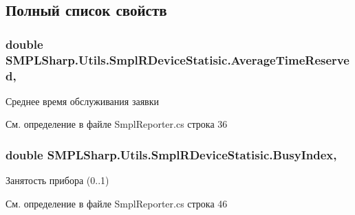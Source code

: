 \subsection{Полный список свойств}
\hypertarget{class_s_m_p_l_sharp_1_1_utils_1_1_smpl_r_device_statisic_aefc83dcc8f91247e91d1966ada1d7885}{
\subsubsection[{Average\-Time\-Reserved}]{\setlength{\rightskip}{0pt plus 5cm}double S\-M\-P\-L\-Sharp.\-Utils.\-Smpl\-R\-Device\-Statisic.\-Average\-Time\-Reserved\hspace{0.3cm}{\ttfamily [get]}, {\ttfamily [set]}}}\label{d7/d3b/class_s_m_p_l_sharp_1_1_utils_1_1_smpl_r_device_statisic_aefc83dcc8f91247e91d1966ada1d7885}


Среднее время обслуживания заявки 



См. определение в файле Smpl\-Reporter.\-cs строка 36

\hypertarget{class_s_m_p_l_sharp_1_1_utils_1_1_smpl_r_device_statisic_a437aa023cf628ea90f8a0f7091fb7e27}{
\subsubsection[{Busy\-Index}]{\setlength{\rightskip}{0pt plus 5cm}double S\-M\-P\-L\-Sharp.\-Utils.\-Smpl\-R\-Device\-Statisic.\-Busy\-Index\hspace{0.3cm}{\ttfamily [get]}, {\ttfamily [set]}}}\label{d7/d3b/class_s_m_p_l_sharp_1_1_utils_1_1_smpl_r_device_statisic_a437aa023cf628ea90f8a0f7091fb7e27}


Занятость прибора (0..1) 



См. определение в файле Smpl\-Reporter.\-cs строка 46

